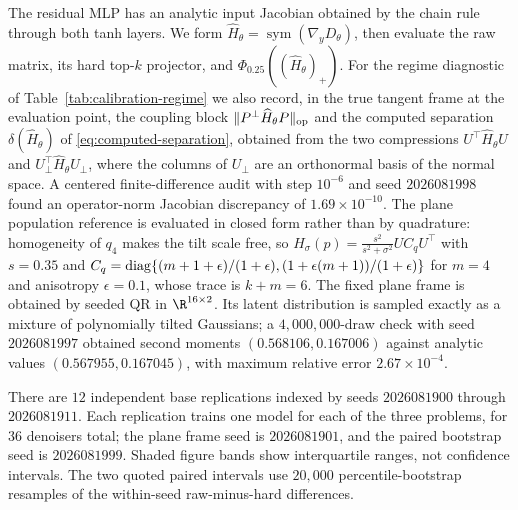 The residual MLP has an analytic input Jacobian obtained by the chain
rule through both tanh layers.  We form
$\widehat H_\theta=\operatorname{sym}(\nabla_yD_\theta)$, then evaluate the raw
matrix, its hard top-$k$ projector, and $\Phi_{0.25}((\widehat H_\theta)_+)$.
For the regime diagnostic of Table~\ref{tab:calibration-regime} we also record,
in the true tangent frame at the evaluation point, the coupling block
$\|P^\perp\widehat H_\theta P\|_{\mathrm{op}}$ and the computed separation
$\delta(\widehat H_\theta)$ of \eqref{eq:computed-separation}, obtained from the
two compressions $U^\top\widehat H_\theta U$ and
$U_\perp^\top\widehat H_\theta U_\perp$, where the columns of $U_\perp$ are an
orthonormal basis of the normal space.  A
centered finite-difference audit with step $10^{-6}$ and seed $2026081998$
found an operator-norm Jacobian discrepancy of $1.69\times10^{-10}$.  The plane population reference is evaluated in closed form rather than by
quadrature: homogeneity of $q_4$ makes the tilt scale free, so
$H_\sigma(p)=\tfrac{s^2}{s^2+\sigma^2}UC_qU^\top$ with $s=0.35$ and
$C_q=\operatorname{diag}\{(m+1+\epsilon)/(1+\epsilon),(1+\epsilon(m+1))/(1+\epsilon)\}$ for
$m=4$ and anisotropy $\epsilon=0.1$, whose trace is $k+m=6$.  The fixed
plane frame is obtained by seeded QR in $\R^{16\times2}$.  Its latent
distribution is sampled exactly as a mixture of polynomially tilted
Gaussians; a $4{,}000{,}000$-draw check with seed $2026081997$ obtained second
moments $(0.568106,0.167006)$ against analytic values $(0.567955,0.167045)$, with
maximum relative error $2.67\times10^{-4}$.

There are $12$ independent base replications indexed by seeds $2026081900$
through $2026081911$.  Each replication trains one model for each of the three
problems, for $36$ denoisers total; the plane frame seed is $2026081901$, and the paired
bootstrap seed is $2026081999$.  Shaded figure bands show interquartile ranges,
not confidence intervals.  The two quoted paired intervals use $20{,}000$
percentile-bootstrap resamples of the within-seed raw-minus-hard differences.

